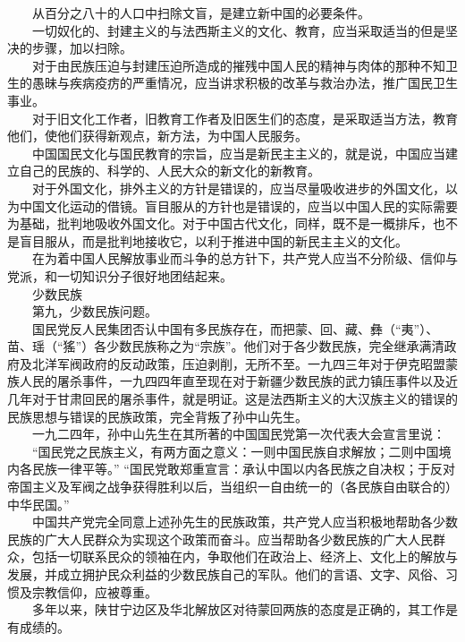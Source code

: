 \documentclass[cn,11pt,chinese]{elegantbook}
\begin{document}
　　从百分之八十的人口中扫除文盲，是建立新中国的必要条件。\\
　　一切奴化的、封建主义的与法西斯主义的文化、教育，应当采取适当的但是坚决的步骤，加以扫除。\\
　　对于由民族压迫与封建压迫所造成的摧残中国人民的精神与肉体的那种不知卫生的愚昧与疾病疫疠的严重情况，应当讲求积极的改革与救治办法，推广国民卫生事业。\\
　　对于旧文化工作者，旧教育工作者及旧医生们的态度，是采取适当方法，教育他们，使他们获得新观点，新方法，为中国人民服务。\\
　　中国国民文化与国民教育的宗旨，应当是新民主主义的，就是说，中国应当建立自己的民族的、科学的、人民大众的新文化的新教育。\\
　　对于外国文化，排外主义的方针是错误的，应当尽量吸收进步的外国文化，以为中国文化运动的借镜。盲目服从的方针也是错误的，应当以中国人民的实际需要为基础，批判地吸收外国文化。对于中国古代文化，同样，既不是一概排斥，也不是盲目服从，而是批判地接收它，以利于推进中国的新民主主义的文化。\\
　　在为着中国人民解放事业而斗争的总方针下，共产党人应当不分阶级、信仰与党派，和一切知识分子很好地团结起来。\\
　　少数民族\\
　　第九，少数民族问题。\\
　　国民党反人民集团否认中国有多民族存在，而把蒙、回、藏、彝（“夷”）、苗、瑶（“猺”）各少数民族称之为“宗族”。他们对于各少数民族，完全继承满清政府及北洋军阀政府的反动政策，压迫剥削，无所不至。一九四三年对于伊克昭盟蒙族人民的屠杀事件，一九四四年直至现在对于新疆少数民族的武力镇压事件以及近几年对于甘肃回民的屠杀事件，就是明证。这是法西斯主义的大汉族主义的错误的民族思想与错误的民族政策，完全背叛了孙中山先生。\\
　　一九二四年，孙中山先生在其所著的中国国民党第一次代表大会宣言里说：\\
　　“国民党之民族主义，有两方面之意义：一则中国民族自求解放；二则中国境内各民族一律平等。” “国民党敢郑重宣言：承认中国以内各民族之自决权；于反对帝国主义及军阀之战争获得胜利以后，当组织一自由统一的（各民族自由联合的）中华民国。”\\
　　中国共产党完全同意上述孙先生的民族政策，共产党人应当积极地帮助各少数民族的广大人民群众为实现这个政策而奋斗。应当帮助各少数民族的广大人民群众，包括一切联系民众的领袖在内，争取他们在政治上、经济上、文化上的解放与发展，并成立拥护民众利益的少数民族自己的军队。他们的言语、文字、风俗、习惯及宗教信仰，应被尊重。\\
　　多年以来，陕甘宁边区及华北解放区对待蒙回两族的态度是正确的，其工作是有成绩的。\\
\end{document}
